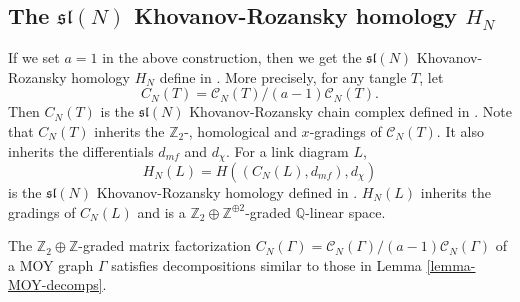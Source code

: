\documentclass{amsart}
\theoremstyle{plain}
\theoremstyle{definition}
\theoremstyle{remark}
\numberwithin{equation}{section}
\begin{document}
\subsection{The ${\mathfrak{sl}}(N)$ Khovanov-Rozansky homology $H_N$}\label{subsec-KR-sl-N} If we set $a=1$ in the above construction, then we get the ${\mathfrak{sl}}(N)$ Khovanov-Rozansky homology $H_N$ define in \cite{KR1}. More precisely, for any tangle $T$, let 
\begin{equation}\label{eq-def-KR-chain}
C_N(T) = {\mathcal{C}}_N(T)/(a-1){\mathcal{C}}_N(T).
\end{equation}
Then $C_N(T)$ is the ${\mathfrak{sl}}(N)$ Khovanov-Rozansky chain complex defined in \cite{KR1}. Note that $C_N(T)$ inherits the ${\mathbb{Z}}_2$-, homological and $x$-gradings of ${\mathcal{C}}_N(T)$. It also inherits the differentials $d_{mf}$ and $d_\chi$. For a link diagram $L$, 
\begin{equation}\label{eq-def-KR-homology}
H_N(L) = H((C_N(L),d_{mf}),d_\chi)
\end{equation}
is the ${\mathfrak{sl}}(N)$ Khovanov-Rozansky homology defined in \cite{KR1}. $H_N(L)$ inherits the gradings of $C_N(L)$ and is a ${\mathbb{Z}}_2\oplus {\mathbb{Z}}^{\oplus 2}$-graded ${\mathbb{Q}}$-linear space.

The ${\mathbb{Z}}_2 \oplus {\mathbb{Z}}$-graded matrix factorization $C_N(\Gamma) = {\mathcal{C}}_N(\Gamma)/(a-1){\mathcal{C}}_N(\Gamma)$ of a MOY graph $\Gamma$ satisfies decompositions similar to those in Lemma \ref{lemma-MOY-decomps}.
\end{document}
